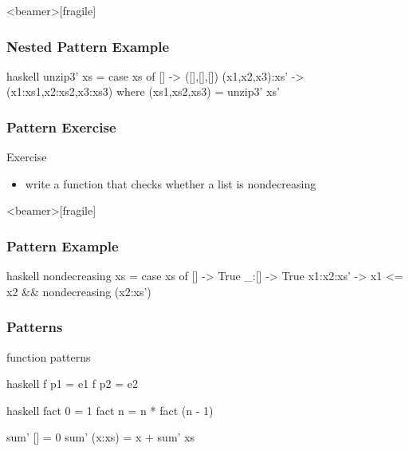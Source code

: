 \documentclass[dvipsnames]{beamer}
\theoremstyle{plain}
\begin{document}
\begin{frame}<beamer>[fragile]
  \frametitle{Nested Pattern Example}

  \begin{example}
    \begin{pygments}{haskell}
unzip3' xs =
    case xs of
      [] -> ([],[],[])
      (x1,x2,x3):xs' -> (x1:xs1,x2:xs2,x3:xs3)
                        where (xs1,xs2,xs3) = unzip3' xs'
    \end{pygments}
  \end{example}
\end{frame}

\begin{frame}
  \frametitle{Pattern Exercise}

  \begin{block}{Exercise}
    \begin{itemize}
      \item write a function that checks whether a list is nondecreasing
    \end{itemize}
  \end{block}
\end{frame}

\begin{frame}<beamer>[fragile]
  \frametitle{Pattern Example}

  \begin{example}
    \begin{pygments}{haskell}
nondecreasing xs =
    case xs of
      [] -> True
      _:[] -> True
      x1:x2:xs' -> x1 <= x2 && nondecreasing (x2:xs')
    \end{pygments}
  \end{example}
\end{frame}

\begin{frame}[fragile]
  \frametitle{Patterns}

  \begin{block}{function patterns}
    \begin{pygments}{haskell}
f p1 = e1
f p2 = e2
    \end{pygments}
  \end{block}

  \pause
  \begin{example}
    \begin{pygments}{haskell}
fact 0 = 1
fact n = n * fact (n - 1)

sum' [] = 0
sum' (x:xs) = x + sum' xs
    \end{pygments}
  \end{example}
\end{frame}
\end{document}
